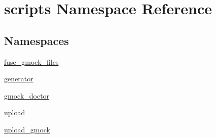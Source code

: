 \hypertarget{namespacescripts}{}\section{scripts Namespace Reference}
\label{namespacescripts}
\subsection*{Namespaces}
\begin{DoxyCompactItemize}
\item 
 \mbox{\hyperlink{namespacescripts_1_1fuse__gmock__files}{fuse\+\_\+gmock\+\_\+files}}
\item 
 \mbox{\hyperlink{namespacescripts_1_1generator}{generator}}
\item 
 \mbox{\hyperlink{namespacescripts_1_1gmock__doctor}{gmock\+\_\+doctor}}
\item 
 \mbox{\hyperlink{namespacescripts_1_1upload}{upload}}
\item 
 \mbox{\hyperlink{namespacescripts_1_1upload__gmock}{upload\+\_\+gmock}}
\end{DoxyCompactItemize}
